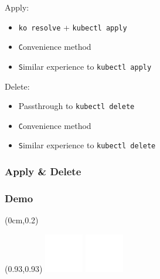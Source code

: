 \documentclass[aspectratio=169,11pt,hyperref={colorlinks=true}]{beamer}
\begin{document}
\begin{2columnsframe}
\begin{2columnsframe}%
  {
    Apply:
    \begin{itemize}
      \item \texttt{ko resolve} + \texttt{kubectl apply}
      \item \texttt Convenience method
      \item \texttt Similar experience to \texttt{kubectl apply}
    \end{itemize}
  }
  {
    Delete:
    \begin{itemize}
      \item Passthrough to \texttt{kubectl delete}
      \item \texttt Convenience method
      \item \texttt Similar experience to \texttt{kubectl delete}
    \end{itemize}
  }
  \frametitle{Apply \& Delete}
\end{2columnsframe}

\begin{blackframe}
  \frametitle{Demo}
  \begin{textblock*}{\paperwidth}(0cm,0.2\paperheight)
  \end{textblock*}
  \begin{textblock*}{0.2\paperwidth}(0.93\paperwidth,0.93\paperheight)%
    \includegraphics[width=0.03\paperwidth]{img/cc.png}%
    \includegraphics[width=0.03\paperwidth]{img/zero.png}%
  \end{textblock*}%
\end{blackframe}


\end{2columnsframe}
\end{document}
